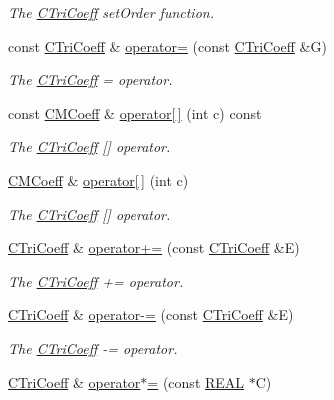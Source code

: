 \begin{DoxyCompactItemize}
\begin{DoxyCompactList}\small\item\em The \hyperlink{classCTriCoeff}{C\-Tri\-Coeff} set\-Order function. \end{DoxyCompactList}\item 
const \hyperlink{classCTriCoeff}{C\-Tri\-Coeff} \& \hyperlink{classCTriCoeff_a303a152b75ea66fcd65f5377b317b4d1}{operator=} (const \hyperlink{classCTriCoeff}{C\-Tri\-Coeff} \&G)
\begin{DoxyCompactList}\small\item\em The \hyperlink{classCTriCoeff}{C\-Tri\-Coeff} = operator. \end{DoxyCompactList}\item 
const \hyperlink{classCMCoeff}{C\-M\-Coeff} \& \hyperlink{classCTriCoeff_ae1643fb9444f997935013aeef30a7c1e}{operator\mbox{[}$\,$\mbox{]}} (int c) const 
\begin{DoxyCompactList}\small\item\em The \hyperlink{classCTriCoeff}{C\-Tri\-Coeff} \mbox{[}\mbox{]} operator. \end{DoxyCompactList}\item 
\hyperlink{classCMCoeff}{C\-M\-Coeff} \& \hyperlink{classCTriCoeff_ad336c1bb46a865f0543c13ec3bf10557}{operator\mbox{[}$\,$\mbox{]}} (int c)
\begin{DoxyCompactList}\small\item\em The \hyperlink{classCTriCoeff}{C\-Tri\-Coeff} \mbox{[}\mbox{]} operator. \end{DoxyCompactList}\item 
\hyperlink{classCTriCoeff}{C\-Tri\-Coeff} \& \hyperlink{classCTriCoeff_aef9fe1d38095a8764a1d65117c1ca10a}{operator+=} (const \hyperlink{classCTriCoeff}{C\-Tri\-Coeff} \&E)
\begin{DoxyCompactList}\small\item\em The \hyperlink{classCTriCoeff}{C\-Tri\-Coeff} += operator. \end{DoxyCompactList}\item 
\hyperlink{classCTriCoeff}{C\-Tri\-Coeff} \& \hyperlink{classCTriCoeff_a6b15143e57034f33f5e1a716d995ff95}{operator-\/=} (const \hyperlink{classCTriCoeff}{C\-Tri\-Coeff} \&E)
\begin{DoxyCompactList}\small\item\em The \hyperlink{classCTriCoeff}{C\-Tri\-Coeff} -\/= operator. \end{DoxyCompactList}\item 
\hyperlink{classCTriCoeff}{C\-Tri\-Coeff} \& \hyperlink{classCTriCoeff_aec9e2fe8be849b6dfbcfd962c45c1695}{operator$\ast$=} (const \hyperlink{util_8h_a5821460e95a0800cf9f24c38915cbbde}{R\-E\-A\-L} $\ast$C)

\end{DoxyCompactItemize}
